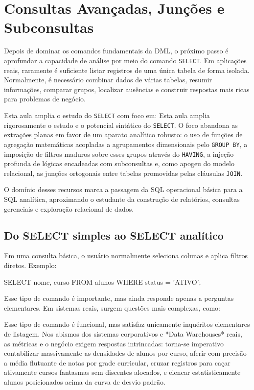 \chapter{Consultas Avançadas, Junções e Subconsultas}
\label{cap:consultas_avancadas_joins_subconsultas}

Depois de dominar os comandos fundamentais da DML, o próximo passo é aprofundar a capacidade de análise por meio do comando \texttt{SELECT}. Em aplicações reais, raramente é suficiente listar registros de uma única tabela de forma isolada. Normalmente, é necessário combinar dados de várias tabelas, resumir informações, comparar grupos, localizar ausências e construir respostas mais ricas para problemas de negócio.

Esta aula amplia o estudo do \texttt{SELECT} com foco em:
Esta aula amplia rigorosamente o estudo e o potencial sintático do \texttt{SELECT}. O foco abandona as extrações planas em favor de um aparato analítico robusto: o uso de funções de agregação matemáticas acopladas a agrupamentos dimensionais pelo \texttt{GROUP BY}, a imposição de filtros maduros sobre esses grupos através do \texttt{HAVING}, a injeção profunda de lógicas encadeadas com subconsultas e, como apogeu do modelo relacional, as junções ortogonais entre tabelas promovidas pelas cláusulas \texttt{JOIN}.

O domínio desses recursos marca a passagem da SQL operacional básica para a SQL analítica, aproximando o estudante da construção de relatórios, consultas gerenciais e exploração relacional de dados.

\section{Do SELECT simples ao SELECT analítico}

Em uma consulta básica, o usuário normalmente seleciona colunas e aplica filtros diretos. Exemplo:

\begin{sqlcode}
SELECT nome, curso
FROM alunos
WHERE status = 'ATIVO';
\end{sqlcode}

Esse tipo de comando é importante, mas ainda responde apenas a perguntas elementares. Em sistemas reais, surgem questões mais complexas, como:

Esse tipo de comando é funcional, mas satisfaz unicamente inquéritos elementares de listagem. Nos abismos dos sistemas corporativos e *Data Warehouses* reais, as métricas e o negócio exigem respostas intrincadas: torna-se imperativo contabilizar massivamente as densidades de alunos por curso, aferir com precisão a média flutuante de notas por grade curricular, cruzar registros para caçar ativamente cursos fantasmas sem discentes alocados, e elencar estatisticamente alunos posicionados acima da curva de desvio padrão.

